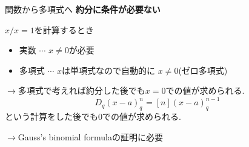 \documentclass[dvipdfmx,cjk]{beamer}
\theoremstyle{mystyle}
\newcommand{\0}{\textbf{0}}
\begin{document}
\begin{frame}{関数から多項式へ} \pause
	\textbf{約分に条件が必要ない} \pause
	
	$x / x = 1$を計算するとき
	\begin{itemize}
		\item 実数 $\cdots$ $x \ne 0$が必要 \pause
		\item 多項式 $\cdots$ $x$は単項式なので自動的に $x \ne 0$(ゼロ多項式) \pause
	\end{itemize}
	$\to$多項式で考えれば約分した後でも$x = 0$での値が求められる. \pause
	\[
	  D_q (x - a)^n_q = [n](x - a)^{n - 1}_q
	\]
	という計算をした後でも$0$での値が求められる. \pause
	
	$\to$Gauss's binomial formulaの証明に必要
\end{frame}

%	

%
%	
\end{document}

